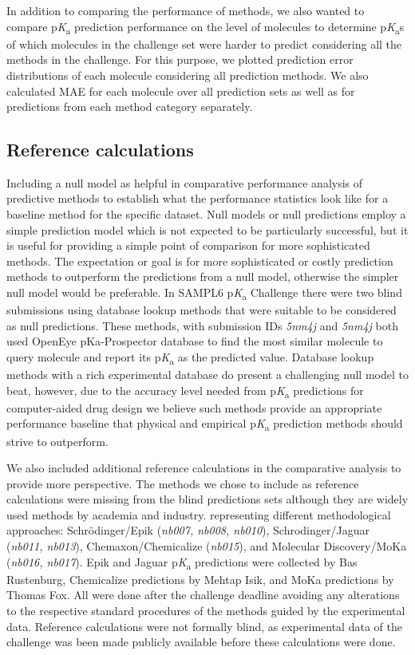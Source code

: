 \documentclass[9pt,lineno,final]{elife}
\newcommand{\pKa}{p\textit{K}\textsubscript{a}}
\begin{document}
In addition to comparing the performance of methods, we also wanted to compare \pKa{} prediction performance on the level of molecules to determine \pKa{}s of which molecules in the challenge set were harder to predict considering all the methods in the challenge. 
For this purpose, we plotted prediction error distributions of each molecule considering all prediction methods. 
We also calculated MAE for each molecule over all prediction sets as well as for predictions from each method category separately. 


\subsection{Reference calculations}

Including a null model as helpful in comparative performance analysis of predictive methods to establish what the performance statistics look like for a baseline method for the specific dataset. 
Null models or null predictions employ a simple prediction model which is not expected to be particularly successful, but it is useful for providing a simple point of comparison for more sophisticated methods. The expectation or goal is for more sophisticated or costly prediction methods to outperform the predictions from a null model, otherwise the simpler null model would be preferable. In SAMPL6 \pKa{} Challenge there were two blind submissions using database lookup methods that were suitable to be considered as null predictions. These methods, with submission IDs \textit{5nm4j} and \textit{5nm4j} both used OpenEye pKa-Prospector database to find the most similar molecule to query molecule and report its \pKa{} as the predicted value. 
Database lookup methods with a rich experimental database do present a challenging null model to beat, however, due to the accuracy level needed from \pKa{} predictions for computer-aided drug design we believe such methods provide an appropriate performance baseline that physical and empirical \pKa{} prediction methods should strive to outperform.

We also included additional reference calculations in the comparative analysis to provide more perspective. 
The methods we chose to include as reference calculations were missing from the blind predictions sets although they are widely used methods by academia and industry.
representing different methodological approaches: Schr\"{o}dinger/Epik (\textit{nb007, nb008, nb010}), Schrodinger/Jaguar (\textit{nb011, nb013}), Chemaxon/Chemicalize (\textit{nb015}), and Molecular Discovery/MoKa (\textit{nb016, nb017}). Epik and Jaguar \pKa{} predictions were collected by Bas Rustenburg, Chemicalize predictions by Mehtap Isik, and MoKa predictions by Thomas Fox. All were done after the challenge deadline avoiding any alterations to the respective standard procedures of the methods guided by the experimental data. 
Reference calculations were not formally blind, as experimental data of the challenge was been made publicly available before these calculations were done. 
\end{document}
